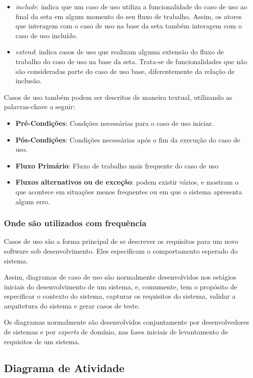 \begin{itemize}
\item \textit{include}: indica que um caso de uso utiliza a funcionalidade do caso de uso ao final da seta em algum momento do seu fluxo de trabalho. Assim, os atores que interagem com o caso de uso na base da seta também interagem com o caso de uso incluído.
\item \textit{extend}: indica casos de uso que realizam alguma extensão do fluxo de trabalho do caso de uso na base da seta. Trata-se de funcionalidades que não são consideradas parte do caso de uso base, diferentemente da relação de inclusão.
\end{itemize}

Casos de uso também podem ser descritos de maneira textual, utilizando as palavras-chave a seguir:
\begin{itemize}
\item \textbf{Pré-Condições}: Condções necessárias para o caso de uso iniciar.
\item \textbf{Pós-Condições}: Condições necessárias após o fim da execução do caso de uso.
\item \textbf{Fluxo Primário}: Fluxo de trabalho mais frequente do caso de uso
\item \textbf{Fluxos alternativos ou de exceção}: podem existir vários, e mostram o que acontece em situações menos frequentes ou em que o sistema apresenta algum erro.
\end{itemize}

\subsubsection{Onde são utilizados com frequência}

Casos de uso são a forma principal de se descrever os requisitos para um novo software sob desenvolvimento. Eles especificam o comportamento esperado do sistema.

Assim, diagramas de caso de uso são normalmente desenvolvidos nos estágios iniciais do desenvolvimento de um sistema, e, comumente, tem o propósito de especificar o contexto do sistema, capturar os requisitos do sistema, validar a arquitetura do sistema e gerar casos de teste.

Os diagramas normalmente são desenvolvidos conjuntamente por desenvolvedores de sistemas e por \textit{experts} de domínio, nas fases iniciais de levantamento de requisitos de um sistema. 

\subsection{Diagrama de Atividade}
